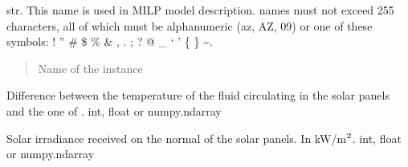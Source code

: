 \documentclass[letterpaper,10pt,english]{sphinxmanual}
\begin{document}
\begin{fulllineitems}

\begin{fulllineitems}
\label{\detokenize{generated/tamos.production.FPSolar:tamos.production.FPSolar.name}}
\pysigstartsignatures
{}
\pysigstopsignatures
\sphinxAtStartPar
str.
This name is used in MILP model description.
names must not exceed 255 characters,
all of which must be alphanumeric (a\sphinxhyphen{}z, A\sphinxhyphen{}Z, 0\sphinxhyphen{}9) or one of these symbols:
! ” \# \$ \% \& , . ; ? @ \_ ‘ ’ \{ \} \textasciitilde{}.
\begin{quote}\begin{description}
\sphinxAtStartPar
Name of the instance

\end{description}\end{quote}

\end{fulllineitems}


\begin{fulllineitems}
\label{\detokenize{generated/tamos.production.FPSolar:tamos.production.FPSolar.pinch}}
\pysigstartsignatures
{}
\pysigstopsignatures
\sphinxAtStartPar
Difference between the temperature of the fluid circulating in the solar panels and the one of .
int, float or numpy.ndarray

\end{fulllineitems}


\begin{fulllineitems}
\label{\detokenize{generated/tamos.production.FPSolar:tamos.production.FPSolar.total_irradiance}}
\pysigstartsignatures
{}
\pysigstopsignatures
\sphinxAtStartPar
Solar irradiance received on the normal of the solar panels.
In kW/m\(\sp{\text{2}}\).
int, float or numpy.ndarray


\end{fulllineitems}
\end{fulllineitems}
\end{document}
